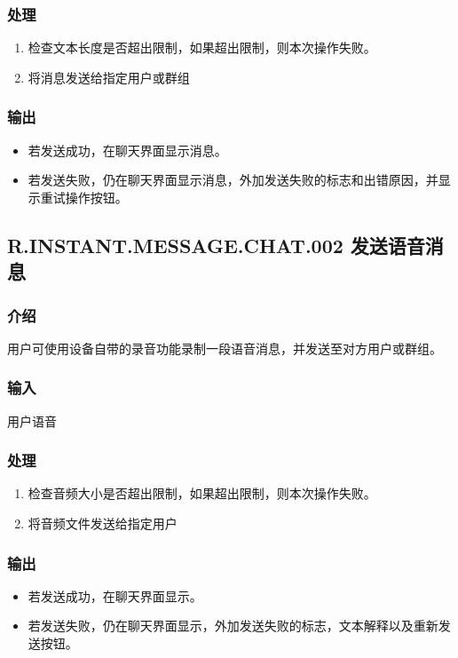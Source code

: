 \subsubsection{处理}
\begin{enumerate}
	\item 检查文本长度是否超出限制，如果超出限制，则本次操作失败。
	\item 将消息发送给指定用户或群组

	\end{enumerate}

\subsubsection{输出}
\begin{itemize}
	\item 若发送成功，在聊天界面显示消息。
	\item 若发送失败，仍在聊天界面显示消息，外加发送失败的标志和出错原因，并显示重试操作按钮。
	\end{itemize}
	

\subsection{R.INSTANT.MESSAGE.CHAT.002 发送语音消息}
\subsubsection{介绍}
用户可使用设备自带的录音功能录制一段语音消息，并发送至对方用户或群组。
\subsubsection{输入}
用户语音
\subsubsection{处理}
\begin{enumerate}
	\item 检查音频大小是否超出限制，如果超出限制，则本次操作失败。
	\item 将音频文件发送给指定用户
	\end{enumerate}
\subsubsection{输出}
\begin{itemize}
	\item 若发送成功，在聊天界面显示。
	\item 若发送失败，仍在聊天界面显示，外加发送失败的标志，文本解释以及重新发送按钮。
	\end{itemize}
